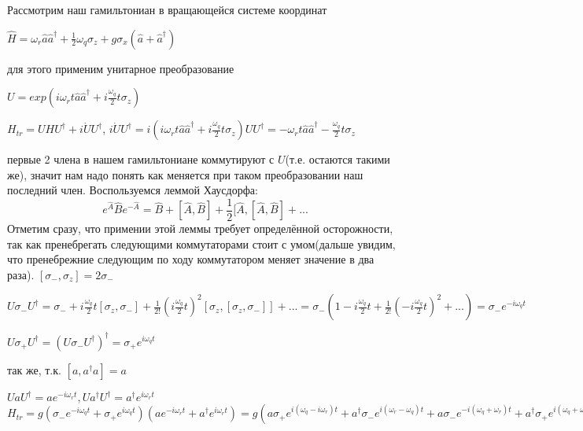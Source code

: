 \documentclass[12pt, a4paper, openany]{book}
\begin{document}
Рассмотрим наш гамильтониан в вращающейся системе координат
\begin{center}

$\hat{H}=\omega_r\hat{a}\hat{a}^{\dagger}+\frac{1}{2}\omega_q\sigma_z+
g\sigma_x(\hat{a}+\hat{a}^{\dagger})$

\end{center}
для этого применим унитарное преобразование
\begin{center}
 $U=exp(i\omega_rt\hat{a}\hat{a}^{\dagger}+i\frac{\omega_q}{2}t\sigma_z)$
\end{center}
\begin{center}
$H_{tr}=UHU^{\dagger}+i\dot{U}U^{\dagger}$,
$i\dot{U}U^{\dagger}=i(i\omega_rt\hat{a}\hat{a}^{\dagger}+i\frac{\omega_q}{2}t\sigma_z)UU^{\dagger}=-\omega_rt\hat{a}\hat{a}^{\dagger}-\frac{\omega_q}{2}t\sigma_z$
\end{center}
первые 2 члена в нашем гамильтониане коммутируют с $U$(т.е. остаются такими же), значит нам надо понять как меняется при таком преобразовании наш последний член.
Воспользуемся леммой Хаусдорфа:
\begin{equation}
e^{\hat{A}} \hat{B} e^{-\hat{A}} = \hat{B}+[\hat{A},\hat{B}]+\frac{1}{2}[\hat{A},[\hat{A},\hat{B}]+...
\label{eq:Hausdorf}
\end{equation}
Отметим сразу, что примении этой леммы требует определённой осторожности, так как пренебрегать следующими коммутаторами стоит с умом(дальше увидим, что пренебрежние следующим по ходу коммутатором меняет значение в два раза).
$[\sigma_-,\sigma_z]=2\sigma_-$
\begin{center}
$U\sigma_-U^{\dagger}=\sigma_- +
i\frac{\omega_q}{2}t[\sigma_z,\sigma_-]+
\frac{1}{2!}(i\frac{\omega_q}{2}t)^2[\sigma_z,[\sigma_z,\sigma_-]]+...
=\sigma_-(1- i\frac{\omega_q}{2}t+\frac{1}{2!}(-i\frac{\omega_q}{2}t)^2+...)=\sigma_-e^{-i\omega_qt}$
\end{center}
\begin{center}
$U\sigma_+U^{\dagger}=(U\sigma_-U^{\dagger})^{\dagger}=
\sigma_+e^{i\omega_qt}$
\end{center} 
так же, т.к. $[a,a^{\dagger}a]=a$
\begin{center}
$UaU^{\dagger}=ae^{-i\omega_rt},
Ua^{\dagger}U^{\dagger}=a^{\dagger} e^{i\omega_rt}$\\
$H_{tr}=g(\sigma_-e^{-i\omega_qt}+\sigma_+e^{i\omega_qt})
(ae^{-i\omega_rt}+a^{\dagger}e^{i\omega_rt}) =
g(a\sigma_+e^{i(\omega_q-i\omega_r)t}+
a^{\dagger}\sigma_-e^{i(\omega_r-\omega_q)t}+
a\sigma_-e^{-i(\omega_q+\omega_r)t}+
a^{\dagger}\sigma_+e^{i(\omega_q+\omega_r)t})$
\end{center}
\end{document}
